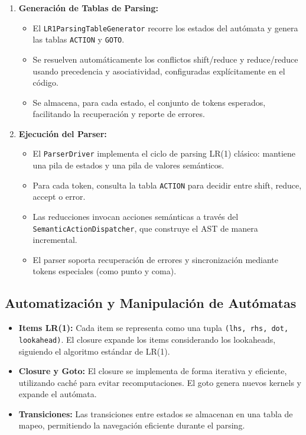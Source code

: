 \documentclass[11pt, a4paper, twoside]{article} %
\begin{document}
\begin{enumerate}
    \item \textbf{Generación de Tablas de Parsing:}
    \begin{itemize}
        \item El \texttt{LR1ParsingTableGenerator} recorre los estados del autómata y genera las tablas \texttt{ACTION} y \texttt{GOTO}.
        \item Se resuelven automáticamente los conflictos shift/reduce y reduce/reduce usando precedencia y asociatividad, configuradas explícitamente en el código.
        \item Se almacena, para cada estado, el conjunto de tokens esperados, facilitando la recuperación y reporte de errores.
    \end{itemize}

    \item \textbf{Ejecución del Parser:}
    \begin{itemize}
        \item El \texttt{ParserDriver} implementa el ciclo de parsing LR(1) clásico: mantiene una pila de estados y una pila de valores semánticos.
        \item Para cada token, consulta la tabla \texttt{ACTION} para decidir entre shift, reduce, accept o error.
        \item Las reducciones invocan acciones semánticas a través del \texttt{SemanticActionDispatcher}, que construye el AST de manera incremental.
        \item El parser soporta recuperación de errores y sincronización mediante tokens especiales (como punto y coma).
    \end{itemize}
\end{enumerate}

\subsection{Automatización y Manipulación de Autómatas}

\begin{itemize}
    \item \textbf{Items LR(1):} Cada item se representa como una tupla \texttt{(lhs, rhs, dot, lookahead)}. El closure expande los items considerando los lookaheads, siguiendo el algoritmo estándar de LR(1).
    \item \textbf{Closure y Goto:} El closure se implementa de forma iterativa y eficiente, utilizando caché para evitar recomputaciones. El goto genera nuevos kernels y expande el autómata.
    \item \textbf{Transiciones:} Las transiciones entre estados se almacenan en una tabla de mapeo, permitiendo la navegación eficiente durante el parsing.
\end{itemize}
\end{document}
